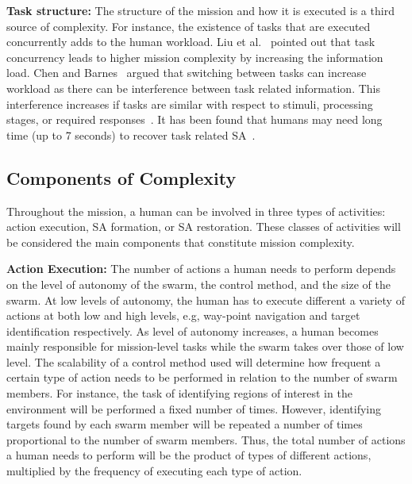 \documentclass[journal]{IEEEtran}
\begin{document}
\textbf{Task structure: }
The structure of the mission and how it is executed is a third source of complexity. For instance, the existence of tasks that are executed concurrently adds to the human workload. Liu et al.~\cite{complexity2012} pointed out that task concurrency  leads to higher mission complexity by increasing the information load. Chen and Barnes~\cite{HATeaming} argued that switching between tasks can increase workload as there can be interference between task related information. This interference increases if tasks are similar with respect to stimuli, processing stages, or required responses~\cite{Caroline}. It has been found that humans may need long time (up to 7 seconds) to recover task related SA~\cite{HATeaming}.

\subsection{Components of Complexity}
Throughout the mission, a human can be involved in three types of activities: action execution, SA formation, or SA restoration. These classes of activities will be considered the main components that constitute mission complexity. 

\textbf{Action Execution: }
The number of actions a human needs to perform depends on the level of autonomy of the swarm, the control method, and the size of the swarm. 
At low levels of autonomy, the human has to execute different a variety of actions at both low and high levels, e.g, way-point navigation and target identification respectively. As level of autonomy increases, a human becomes mainly responsible for mission-level tasks while the swarm takes over those of low level. 
The scalability of a control method used will determine how frequent a certain type of action needs  to be performed in relation to the number of swarm members. 
For instance, the task of identifying regions of interest in the environment will be performed a fixed number of times. 
However, identifying targets found by each swarm member will be repeated a number of times proportional to the number of swarm members. 
Thus, the total number of actions a human needs to perform will be the product of types of different actions, multiplied by the frequency of executing each type of action. 
\end{document}
